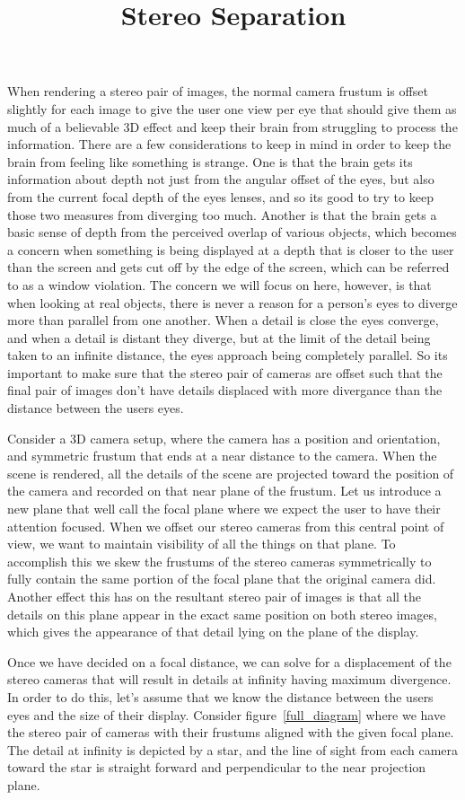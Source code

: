 \documentclass[12pt]{article}
\title{Stereo Separation}
\date{}
\begin{document}
When rendering a stereo pair of images, the normal camera frustum is offset slightly for each image to give the user one view per eye that should give them as much of a believable 3D effect and keep their brain from struggling to process the information.  There are a few considerations to keep in mind in order to keep the brain from feeling like something is strange.  One is that the brain gets its information about depth not just from the angular offset of the eyes, but also from the current focal depth of the eyes lenses, and so its good to try to keep those two measures from diverging too much.  Another is that the brain gets a basic sense of depth from the perceived overlap of various objects, which becomes a concern when something is being displayed at a depth that is closer to the user than the screen and gets cut off by the edge of the screen, which can be referred to as a window violation.  The concern we will focus on here, however, is that when looking at real objects, there is never a reason for a person's eyes to diverge more than parallel from one another.  When a detail is close the eyes converge, and when a detail is distant they diverge, but at the limit of the detail being taken to an infinite distance, the eyes approach being completely parallel.  So its important to make sure that the stereo pair of cameras are offset such that the final pair of images don't have details displaced with more divergance than the distance between the users eyes.

Consider a 3D camera setup, where the camera has a position and orientation, and symmetric frustum that ends at a near distance to the camera.  When the scene is rendered, all the details of the scene are projected toward the position of the camera and recorded on that near plane of the frustum.  Let us introduce a new plane that well call the focal plane where we expect the user to have their attention focused.  When we offset our stereo cameras from this central point of view, we want to maintain visibility of all the things on that plane.  To accomplish this we skew the frustums of the stereo cameras symmetrically to fully contain the same portion of the focal plane that the original camera did.  Another effect this has on the resultant stereo pair of images is that all the details on this plane appear in the exact same position on both stereo images, which gives the appearance of that detail lying on the plane of the display.

Once we have decided on a focal distance, we can solve for a displacement of the stereo cameras that will result in details at infinity having maximum divergence.  In order to do this, let's assume that we know the distance between the users eyes and the size of their display.  Consider figure~\ref{full_diagram} where we have the stereo pair of cameras with their frustums aligned with the given focal plane.  The detail at infinity is depicted by a star, and the line of sight from each camera toward the star is straight forward and perpendicular to the near projection plane.
\end{document}
